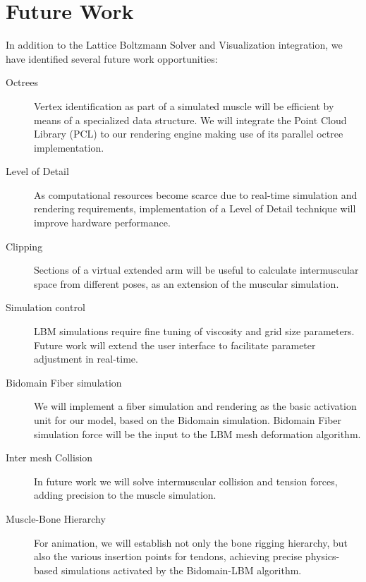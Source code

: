 
\section{Future Work}
\label{sec:futureWork}
In addition to the Lattice Boltzmann Solver and Visualization integration, we have identified several future work opportunities:

\begin{description}
\item[Octrees]
Vertex identification as part of a simulated muscle will be efficient by means of a specialized data structure. We will integrate the Point Cloud Library (PCL) to our rendering engine making use of its parallel octree implementation.
\item[Level of Detail]
As computational resources become scarce due to real-time simulation and rendering requirements, implementation of a Level of Detail technique will improve hardware performance.
\item[Clipping]
Sections of a virtual extended arm will be useful to calculate intermuscular space from different poses, as an extension of the muscular simulation.
\item[Simulation control]
LBM simulations require fine tuning of viscosity and grid size parameters. Future work will extend the user interface to facilitate parameter adjustment in real-time.
\item[Bidomain Fiber simulation]
We will implement a fiber simulation and rendering as the basic activation unit for our model, based on the Bidomain simulation. Bidomain Fiber simulation force will be the input to the LBM mesh deformation algorithm.
\item[Inter mesh Collision]
In future work we will solve intermuscular collision and tension forces, adding precision to the muscle simulation.
\item[Muscle-Bone Hierarchy]
For animation, we will establish not only the bone rigging hierarchy, but also the various insertion points for tendons, achieving precise physics-based simulations activated by the Bidomain-LBM algorithm.
\end{description}
